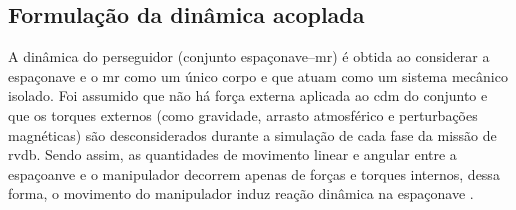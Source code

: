 \subsection{Formulação da dinâmica acoplada}
\label{sec:dinAcoplada_}

A dinâmica do perseguidor (conjunto espaçonave--\gls{mr}) é obtida ao considerar a espaçonave e o \gls{mr} como um único corpo e que atuam como um sistema mecânico isolado.
Foi assumido que não há força externa aplicada ao \gls{cdm} do conjunto e que os torques externos (como gravidade, arrasto atmosférico e perturbações magnéticas) são desconsiderados durante a simulação de cada fase da missão de \gls{rvdb}.
Sendo assim, as quantidades de movimento linear e angular entre a espaçoanve e o manipulador decorrem apenas de forças e torques internos, dessa forma, o movimento do manipulador induz reação dinâmica na espaçonave \cite{Wilde2018}.
